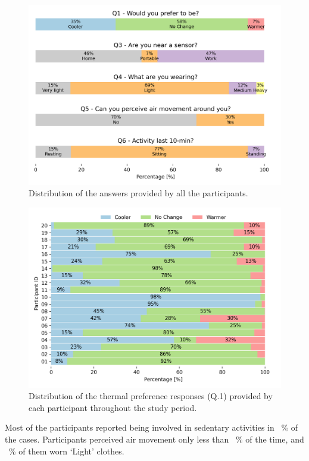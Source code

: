 \begin{figure}[thb!]
    \begin{center}
        \includegraphics[width=\linewidth]{figures/figure_4}
    \end{center}
    \caption{Distribution of the answers provided by all the participants.}\label{fig:ans_distribution}
\end{figure}

\begin{figure}[thb!]
    \begin{center}
        \includegraphics[width=\linewidth,height=\textheight,keepaspectratio]{figures/figure_5}
    \end{center}
    \caption{Distribution of the thermal preference responses (Q.1) provided by each participant throughout the study period.}\label{fig:thermal_by_userid}
\end{figure}
Most of the participants reported being involved in sedentary activities in ~\% of the cases.
Participants perceived air movement only less than ~\% of the time, and ~\% of them worn `Light' clothes.

